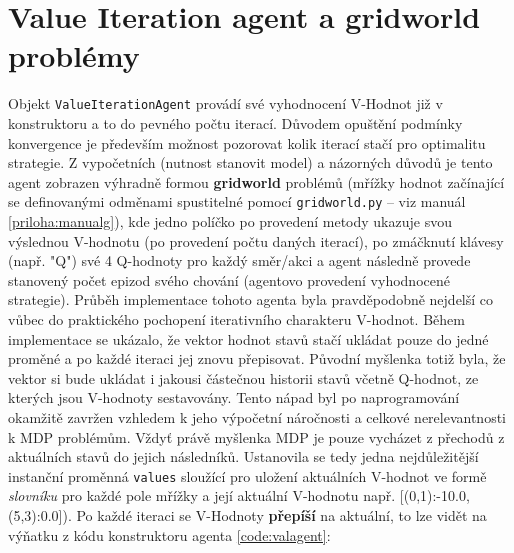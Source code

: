 \section{Value Iteration agent a gridworld problémy}
Objekt \texttt{ValueIterationAgent} provádí své vyhodnocení V-Hodnot již v konstruktoru a to do pevného počtu iterací. Důvodem opuštění podmínky konvergence je především možnost pozorovat kolik iterací stačí pro optimalitu strategie. Z vypočetních (nutnost stanovit model) a názorných důvodů je tento agent zobrazen výhradně formou \textbf{gridworld} problémů (mřížky hodnot začínající se definovanými odměnami spustitelné pomocí \texttt{gridworld.py} -- viz manuál \ref{priloha:manualg}), kde jedno políčko po provedení metody ukazuje svou výslednou V-hodnotu (po provedení počtu daných iterací), po zmáčknutí klávesy (např. "Q") své 4 Q-hodnoty pro každý směr/akci a agent následně provede stanovený počet epizod svého chování (agentovo provedení vyhodnocené strategie). 
Průběh implementace tohoto agenta byla pravděpodobně nejdelší co vůbec do praktického pochopení iterativního charakteru V-hodnot. Během implementace se ukázalo, že vektor hodnot stavů stačí ukládat pouze do jedné proměné a po každé iteraci jej znovu přepisovat. Původní myšlenka totiž byla, že vektor si bude ukládat i jakousi částečnou historii stavů včetně Q-hodnot, ze kterých jsou V-hodnoty sestavovány. Tento nápad byl po naprogramování okamžitě zavržen vzhledem k jeho výpočetní náročnosti a celkové nerelevantnosti k MDP problémům. Vždyť právě myšlenka MDP je pouze vycházet z přechodů z aktuálních stavů do jejich následníků. Ustanovila se tedy jedna nejdůležitější instanční proměnná \texttt{values} sloužící pro uložení aktuálních V-hodnot ve formě \textit{slovníku} pro každé pole mřížky a její aktuální V-hodnotu např. [(0,1):-10.0,(5,3):0.0]). Po každé iteraci se V-Hodnoty \textbf{přepíší} na aktuální, to lze vidět na výňatku z kódu konstruktoru agenta \ref{code:valagent}:

